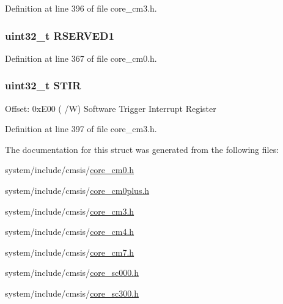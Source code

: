 Definition at line 396 of file core\+\_\+cm3.\+h.

\subsubsection[{\texorpdfstring{R\+S\+E\+R\+V\+E\+D1}{RSERVED1}}]{\setlength{\rightskip}{0pt plus 5cm}uint32\+\_\+t R\+S\+E\+R\+V\+E\+D1}\hypertarget{struct_n_v_i_c___type_aea9a4f17e5fa16fa35ba48cc9f27434b}{}\label{struct_n_v_i_c___type_aea9a4f17e5fa16fa35ba48cc9f27434b}


Definition at line 367 of file core\+\_\+cm0.\+h.

\subsubsection[{\texorpdfstring{S\+T\+IR}{STIR}}]{ uint32\+\_\+t S\+T\+IR}\hypertarget{struct_n_v_i_c___type_ada9cbba14ab1cc3fddd585f870932db8}{}\label{struct_n_v_i_c___type_ada9cbba14ab1cc3fddd585f870932db8}
Offset\+: 0x\+E00 ( /W) Software Trigger Interrupt Register 

Definition at line 397 of file core\+\_\+cm3.\+h.



The documentation for this struct was generated from the following files\+:\begin{DoxyCompactItemize}
\item 
system/include/cmsis/\hyperlink{core__cm0_8h}{core\+\_\+cm0.\+h}\item 
system/include/cmsis/\hyperlink{core__cm0plus_8h}{core\+\_\+cm0plus.\+h}\item 
system/include/cmsis/\hyperlink{core__cm3_8h}{core\+\_\+cm3.\+h}\item 
system/include/cmsis/\hyperlink{core__cm4_8h}{core\+\_\+cm4.\+h}\item 
system/include/cmsis/\hyperlink{core__cm7_8h}{core\+\_\+cm7.\+h}\item 
system/include/cmsis/\hyperlink{core__sc000_8h}{core\+\_\+sc000.\+h}\item 
system/include/cmsis/\hyperlink{core__sc300_8h}{core\+\_\+sc300.\+h}\end{DoxyCompactItemize}
